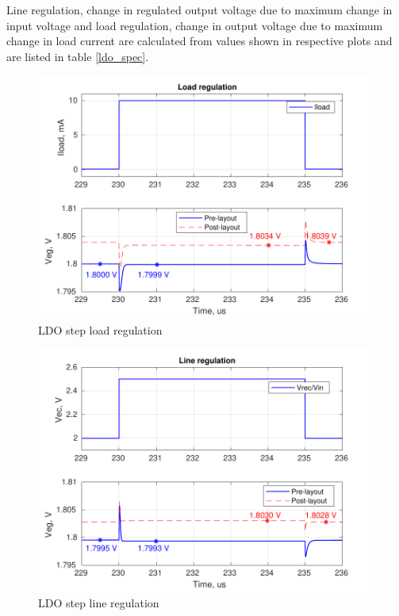 \documentclass[UKenglish]{ifimaster}  %
\begin{document}
 Line regulation, change in regulated output voltage due to maximum change in input voltage and load regulation, change in output voltage due to maximum change in load current are calculated from values shown in respective plots and are listed in table \ref{ldo_spec}.

\begin{figure}[H] %
   \centering
   \includegraphics[width=\textwidth]{img/ldo_loadr_both.pdf} 
   \caption{LDO step load regulation}
   \label{fig:ldo_loadr}
\end{figure}

\begin{figure}[H] %
   \centering
   \includegraphics[width=\textwidth]{img/ldo_liner_both.pdf} 
   \caption{LDO step line regulation}
   \label{fig:ldo_liner}
\end{figure}
\end{document}

